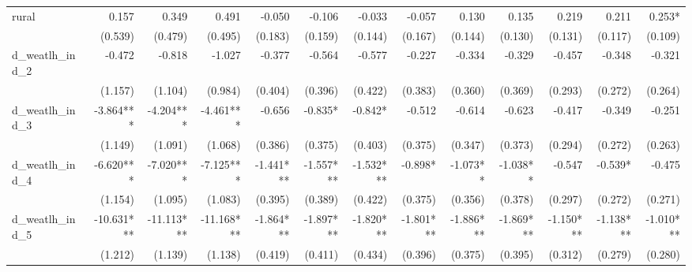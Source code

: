 \begin{tabular}{lrrrrrrrrrrrr}
rural                                       &        0.157 &        0.349 &        0.491 &       -0.050 &       -0.106 &       -0.033 &       -0.057 &        0.130 &        0.135 &        0.219 &        0.211 &       0.253* \\ 
                                            &      (0.539) &      (0.479) &      (0.495) &      (0.183) &      (0.159) &      (0.144) &      (0.167) &      (0.144) &      (0.130) &      (0.131) &      (0.117) &      (0.109) \\ 
d\_weatlh\_ind\_2                           &       -0.472 &       -0.818 &       -1.027 &       -0.377 &       -0.564 &       -0.577 &       -0.227 &       -0.334 &       -0.329 &       -0.457 &       -0.348 &       -0.321 \\ 
                                            &      (1.157) &      (1.104) &      (0.984) &      (0.404) &      (0.396) &      (0.422) &      (0.383) &      (0.360) &      (0.369) &      (0.293) &      (0.272) &      (0.264) \\ 
d\_weatlh\_ind\_3                           &    -3.864*** &    -4.204*** &    -4.461*** &       -0.656 &      -0.835* &      -0.842* &       -0.512 &       -0.614 &       -0.623 &       -0.417 &       -0.349 &       -0.251 \\ 
                                            &      (1.149) &      (1.091) &      (1.068) &      (0.386) &      (0.375) &      (0.403) &      (0.375) &      (0.347) &      (0.373) &      (0.294) &      (0.272) &      (0.263) \\ 
d\_weatlh\_ind\_4                           &    -6.620*** &    -7.020*** &    -7.125*** &    -1.441*** &    -1.557*** &    -1.532*** &      -0.898* &     -1.073** &     -1.038** &       -0.547 &      -0.539* &       -0.475 \\ 
                                            &      (1.154) &      (1.095) &      (1.083) &      (0.395) &      (0.389) &      (0.422) &      (0.375) &      (0.356) &      (0.378) &      (0.297) &      (0.272) &      (0.271) \\ 
d\_weatlh\_ind\_5                           &   -10.631*** &   -11.113*** &   -11.168*** &    -1.864*** &    -1.897*** &    -1.820*** &    -1.801*** &    -1.886*** &    -1.869*** &    -1.150*** &    -1.138*** &    -1.010*** \\ 
                                            &      (1.212) &      (1.139) &      (1.138) &      (0.419) &      (0.411) &      (0.434) &      (0.396) &      (0.375) &      (0.395) &      (0.312) &      (0.279) &      (0.280) \\ 

\end{tabular}
